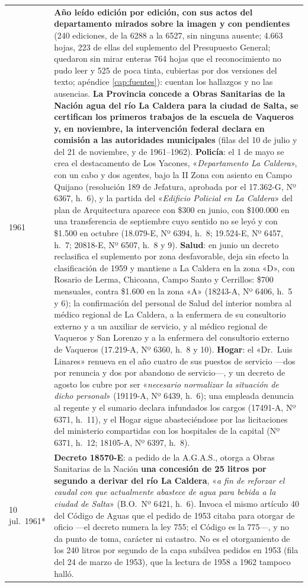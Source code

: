 \begin{longtable}{@{}p{2.7cm}p{10.3cm}@{}}
1961 & \textbf{Año leído edición por edición, con sus actos del departamento mirados sobre la imagen y con pendientes} (240 ediciones, de la 6288 a la 6527, sin ninguna ausente; 4.663 hojas, 223 de ellas del suplemento del Presupuesto General; quedaron sin mirar enteras 764 hojas que el reconocimiento no pudo leer y 525 de poca tinta, cubiertas por dos versiones del texto; apéndice \ref{cap:fuentes}): cuentan los hallazgos y no las ausencias. \textbf{La Provincia concede a Obras Sanitarias de la Nación agua del río La Caldera para la ciudad de Salta, se certifican los primeros trabajos de la escuela de Vaqueros y, en noviembre, la intervención federal declara en comisión a las autoridades municipales} (filas del 10 de julio y del 21 de noviembre, y de 1961--1962). \textbf{Policía}: el 1 de mayo se crea el destacamento de Los Yacones, «\textit{Departamento La Caldera}», con un cabo y dos agentes, bajo la II Zona con asiento en Campo Quijano (resolución 189 de Jefatura, aprobada por el 17.362-G, Nº 6367, h.\ 6), y la partida del «\textit{Edificio Policial en La Caldera}» del plan de Arquitectura aparece con \$300 en junio, con \$100.000 en una transferencia de septiembre cuyo sentido no se leyó y con \$1.500 en octubre (18.079-E, Nº 6394, h.\ 8; 19.524-E, Nº 6457, h.\ 7; 20818-E, Nº 6507, h.\ 8 y 9). \textbf{Salud}: en junio un decreto reclasifica el suplemento por zona desfavorable, deja sin efecto la clasificación de 1959 y mantiene a La Caldera en la zona «D», con Rosario de Lerma, Chicoana, Campo Santo y Cerrillos: \$700 mensuales, contra \$1.600 en la zona «A» (18243-A, Nº 6406, h.\ 5 y 6); la confirmación del personal de Salud del interior nombra al médico regional de La Caldera, a la enfermera de su consultorio externo y a un auxiliar de servicio, y al médico regional de Vaqueros y San Lorenzo y a la enfermera del consultorio externo de Vaqueros (17.219-A, Nº 6360, h.\ 8 y 10). \textbf{Hogar}: el «Dr.\ Luis Linares» renueva en el año cuatro de sus puestos de servicio ---dos por renuncia y dos por abandono de servicio---, y un decreto de agosto los cubre por ser «\textit{necesario normalizar la situación de dicho personal}» (19119-A, Nº 6439, h.\ 6); una empleada denuncia al regente y el sumario declara infundados los cargos (17491-A, Nº 6371, h.\ 11), y el Hogar sigue abasteciéndose por las licitaciones del ministerio compartidas con los hospitales de la capital (Nº 6371, h.\ 12; 18105-A, Nº 6397, h.\ 8). \\
10 jul.\ 1961* & \textbf{Decreto 18570-E}: a pedido de la A.G.A.S., otorga a Obras Sanitarias de la Nación \textbf{una concesión de 25 litros por segundo a derivar del río La Caldera}, «\textit{a fin de reforzar el caudal con que actualmente abastece de agua para bebida a la ciudad de Salta}» (B.O.\ Nº 6421, h.\ 6). Invoca el mismo artículo 40 del Código de Aguas que el pedido de 1953 citaba para otorgar de oficio ---el decreto numera la ley 755; el Código es la 775---, y no da punto de toma, carácter ni catastro. No es el otorgamiento de los 240 litros por segundo de la capa subálvea pedidos en 1953 (fila del 24 de marzo de 1953), que la lectura de 1958 a 1962 tampoco halló. \\

\end{longtable}
